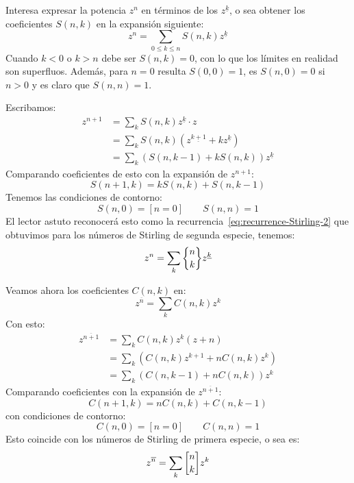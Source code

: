   Interesa expresar la potencia \(z^n\)
  en términos de los \(z^{\underline{k}}\),
  o sea obtener los coeficientes \(S(n, k)\)
  en la expansión siguiente:
  \begin{equation*}
    z^n = \sum_{0 \le k \le n} S(n, k) z^{\underline{k}}
  \end{equation*}
  Cuando \(k < 0\) o \(k > n\) debe ser \(S(n, k) = 0\),
  con lo que los límites en realidad son superfluos.
  Además,
  para \(n = 0\)
  resulta \(S(0, 0) = 1\),
  es \(S(n, 0) = 0\) si \(n > 0\)
  y es claro que \(S(n, n) = 1\).

  Escribamos:
  \begin{align*}
    z^{n + 1}
      &= \sum_k S(n, k) z^{\underline{k}} \cdot z \\
      &= \sum_k
	   S(n, k) (z^{\underline{k + 1}} + k z^{\underline{k}}) \\
      &= \sum_k (S(n, k - 1) + k S(n, k)) z^{\underline{k}}
  \end{align*}
  Comparando coeficientes de esto con la expansión de \(z^{n + 1}\):
  \begin{equation*}
    S(n + 1, k) = k S(n, k) + S(n, k - 1)
  \end{equation*}
  Tenemos las condiciones de contorno:
  \begin{equation*}
    S(n, 0)
      = [n = 0]
    \qquad
    S(n, n)
      = 1
  \end{equation*}
  El lector astuto reconocerá esto
  como la recurrencia~\eqref{eq:recurrence-Stirling-2}
  que obtuvimos para los números de Stirling de segunda especie,
  tenemos:
  \begin{equation}
    \label{eq:Stirling-2-down}
    z^n = \sum_k \classes{n}{k} z^{\underline{k}}
  \end{equation}

  Veamos ahora los coeficientes \(C(n, k)\) en:
  \begin{equation*}
    z^{\overline{n}}
      = \sum_k C(n, k) z^k
  \end{equation*}
  Con esto:
  \begin{align*}
    z^{\overline{n + 1}}
      &= \sum_k C(n, k) z^k (z + n) \\
      &= \sum_k (C(n, k) z^{k + 1} + n C(n, k) z^k) \\
      &= \sum_k (C(n, k - 1) + n C(n, k)) z^k
  \end{align*}
  Comparando coeficientes
  con la expansión de \(z^{\overline{n + 1}}\):
  \begin{equation*}
    C(n + 1, k)
      = n C(n, k) + C(n, k - 1)
  \end{equation*}
  con condiciones de contorno:
  \begin{equation*}
    C(n, 0) = [n = 0] \qquad C(n, n) = 1
  \end{equation*}
  Esto coincide con los números de Stirling de primera especie,
  o sea es:%
  \begin{equation}
    \label{eq:Stirling-1-up}
    z^{\overline{n}}
      = \sum_k \cycle{n}{k} z^k
  \end{equation}

